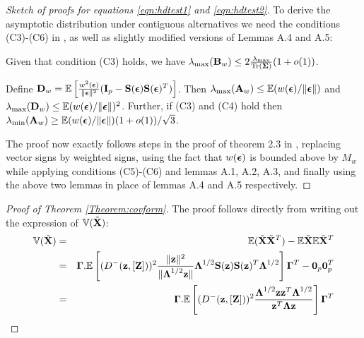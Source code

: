 \begin{proof}[Sketch of proofs for equations \ref{eqn:hdtest1} and \ref{eqn:hdtest2}]
To derive the asymptotic distribution under contiguous alternatives we need the conditions (C3)-(C6) in \cite{WangPengLi15}, as well as slightly modified versions of Lemmas A.4 and A.5:

\begin{Lemma}
Given that condition (C3) holds, we have $\lambda_{\max} ({\mathbf{B}}_w) \leq 2 \frac{\lambda_{\max}}{\text{Tr} ({\boldsymbol{\Sigma}})} (1+o(1))$.
\end{Lemma}

\begin{Lemma}
Define ${\mathbf{D}}_w = {\mathbb{E}} \left[ \frac{w^2({\boldsymbol{\epsilon}})}{\| {\boldsymbol{\epsilon}} \|^2} ({\mathbf{I}}_p - {\mathbf{S}}({\boldsymbol{\epsilon}}) {\mathbf{S}}({\boldsymbol{\epsilon}})^T )\right] $. Then $\lambda_{\max} ({\mathbf{A}}_w) \leq {\mathbb{E}}( w({\boldsymbol{\epsilon}})/\| {\boldsymbol{\epsilon}} \|)$ and $\lambda_{\max} ({\mathbf{D}}_w) \leq {\mathbb{E}}( w({\boldsymbol{\epsilon}})/\| {\boldsymbol{\epsilon}} \|)^2$. Further, if (C3) and (C4) hold then $\lambda_{\min} ({\mathbf{A}}_w) \geq {\mathbb{E}}( w({\boldsymbol{\epsilon}})/\| {\boldsymbol{\epsilon}} \|)(1+o(1))/\sqrt 3$.
\end{Lemma}
%
The proof now exactly follows steps in the proof of theorem 2.3 in \cite{WangPengLi15}, replacing vector signs by weighted signs, using the fact that $w({\boldsymbol{\epsilon}})$ is bounded above by $M_w$ while applying conditions (C5)-(C6) and lemmas A.1, A.2, A.3, and finally using the above two lemmas in place of lemmas A.4 and A.5 respectively.
\end{proof}

\begin{proof}[Proof of Theorem  \ref{Theorem:covform}]
The proof follows directly from writing out the expression of ${\mathbb{V}}( \tilde {{\mathbf{X}}})$:
%
\begin{eqnarray*}
{\mathbb{V}}( \tilde{{\mathbf{X}}}) &=& {\mathbb{E}}(\tilde{{\mathbf{X}}} \tilde{{\mathbf{X}}}^T) - {\mathbb{E}} \tilde{{\mathbf{X}}} {\mathbb{E}} \tilde{{\mathbf{X}}}^T\\
&=& {\boldsymbol{\Gamma}} . {\mathbb{E}} \left[ ( D^- ({\bf{z}}, [{\mathbf{Z}}]) )^2 \frac{\|{\bf{z}}\|^2}{\| {\boldsymbol{\Lambda}}^{1/2}{\bf{z}}\|} {\boldsymbol{\Lambda}}^{1/2} {\mathbf{S}}({\bf{z}}) {\mathbf{S}}({\bf{z}})^T {\boldsymbol{\Lambda}}^{1/2} \right] {\boldsymbol{\Gamma}}^T - {\bf 0}_p {\bf 0}_p^T\\
&=& {\boldsymbol{\Gamma}} .{\mathbb{E}} \left[ (D^- ({\bf{z}}, [{\mathbf{Z}}]))^2 \frac{{\boldsymbol{\Lambda}}^{1/2} {\bf{z}} {\bf{z}}^T {\boldsymbol{\Lambda}}^{1/2}}{{\bf{z}}^T {\boldsymbol{\Lambda}} {\bf{z}}} \right] {\boldsymbol{\Gamma}}^T
\end{eqnarray*}
%
\end{proof}

